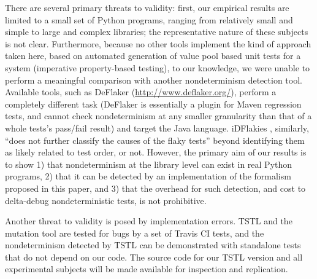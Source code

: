 There are several primary threats to validity:  first, our empirical
results are limited to a small set of Python programs, ranging from
relatively small and simple to large and complex libraries; the
representative nature of these subjects is not clear.
Furthermore, because
no other tools implement the kind of approach taken here, based on
automated generation of value pool based unit tests for a system
(imperative property-based testing), to our knowledge, we were unable
to perform a meaningful comparison with another nondeterminism
detection tool.  Available tools, such as DeFlaker \cite{bell2018d}
(\url{http://www.deflaker.org/}), perform a completely different task (DeFlaker
is essentially a plugin for Maven regression tests, and cannot check
nondeterminism at any smaller granularity than that of a whole tests's
pass/fail result) and target the Java language.  iDFlakies
\cite{idflakies}, similarly, ``does not further classify the causes of
the flaky tests'' beyond identifying them as likely related to test
order, or not.  However, the primary
aim of our results is to show 1) that nondeterminism at the library
level can exist in real Python programs, 2) that it can be detected
by an implementation of the formalism proposed in this paper, and 3)
that the overhead for such detection, and cost to delta-debug
nondeterministic tests, is not prohibitive.

Another threat to validity is posed by implementation errors.
TSTL and the mutation tool are tested for bugs by a set of Travis CI
tests, and the nondeterminism
detected by TSTL can be demonstrated with standalone tests that do not
depend on our code.
The source code for our TSTL version and all experimental subjects will be
made available for inspection and replication.